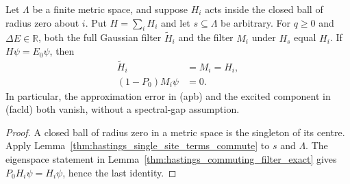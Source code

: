 \begin{lemma}
    \label{thm:hastings_zero_range_exact}
    \leanok
    Let $\Lambda$ be a finite metric space, and suppose $H_i$ acts inside
    the closed ball of radius zero about $i$. Put $H=\sum_iH_i$ and let
    $s\subseteq\Lambda$ be arbitrary. For $q\ge0$ and $\Delta E\in\mathbb R$,
    both the full Gaussian filter $\widetilde H_i$ and the filter $M_i$
    under $H_s$ equal $H_i$. If $H\psi=E_0\psi$, then
    \begin{align*}
        \widetilde H_i & =M_i=H_i, \\
        (1-P_0)M_i\psi & =0.
    \end{align*}
    In particular, the approximation error in (apb) and the excited
    component in (facld) both vanish, without a spectral-gap assumption.
\end{lemma}
\begin{proof}\leanok
    A closed ball of radius zero in a metric space is the singleton of its
    centre. Apply Lemma~\ref{thm:hastings_single_site_terms_commute} to
    $s$ and $\Lambda$. The eigenspace statement in
    Lemma~\ref{thm:hastings_commuting_filter_exact} gives
    $P_0H_i\psi=H_i\psi$, hence the last identity.
\end{proof}
